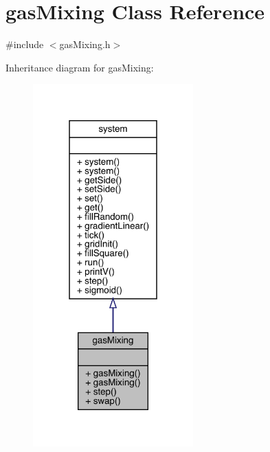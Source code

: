 \hypertarget{classgas_mixing}{}\section{gas\+Mixing Class Reference}
\label{classgas_mixing}


{\ttfamily \#include $<$gas\+Mixing.\+h$>$}



Inheritance diagram for gas\+Mixing\+:
\nopagebreak
\begin{figure}[H]
\begin{center}
\leavevmode
\includegraphics[width=175pt]{classgas_mixing__inherit__graph}
\end{center}
\end{figure}


